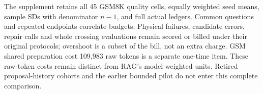 The supplement retains all 45 GSM8K quality cells, equally
weighted seed means, sample SDs with denominator $n-1$, and full actual
ledgers. Common questions and repeated endpoints correlate budgets.
Physical failures, candidate errors, repair calls and whole crossing
evaluations remain scored or billed under their original protocols;
overshoot is a subset of the bill, not an extra charge. GSM shared
preparation cost 109,983 raw tokens is a separate one-time item. These raw-token costs remain distinct
from RAG's model-weighted units. Retired proposal-history cohorts and
the earlier bounded pilot do not enter this complete comparison.
